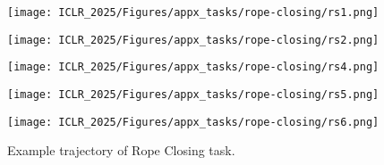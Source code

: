 \begin{figure*}[htb]
    \centering
    \begin{minipage}{0.19\textwidth}
            \centering
            \texttt{[image: ICLR\_2025/Figures/appx\_tasks/rope-closing/rs1.png]}
    \end{minipage}
    \begin{minipage}{0.19\textwidth}
            \centering
            \texttt{[image: ICLR\_2025/Figures/appx\_tasks/rope-closing/rs2.png]}
    \end{minipage}
    \begin{minipage}{0.19\textwidth}
            \centering
            \texttt{[image: ICLR\_2025/Figures/appx\_tasks/rope-closing/rs4.png]}
    \end{minipage}
    \begin{minipage}{0.19\textwidth}
            \centering
            \texttt{[image: ICLR\_2025/Figures/appx\_tasks/rope-closing/rs5.png]}
    \end{minipage}
    \begin{minipage}{0.19\textwidth}
            \centering
            \texttt{[image: ICLR\_2025/Figures/appx\_tasks/rope-closing/rs6.png]}
    \end{minipage}

    \caption{
    Example trajectory of Rope Closing task.
    }
    \label{fig:appendix_rc_vis}
\end{figure*}